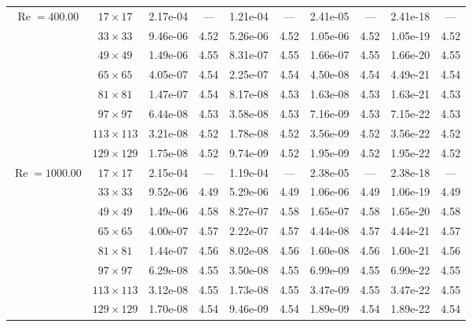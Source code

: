 \documentclass[preprint, 12pt]{elsarticle}
\begin{document}
{\begin{center}
\begin{table}[H]
{\begin{tabular*}{\textwidth}{@{\extracolsep\fill}cccccccccc@{}}
    \hline
    \multirow{7}{*}{$\operatorname{Re}=400.00$} & $17\times 17$ & 2.17e-04 & --- & 1.21e-04 & --- & 2.41e-05 & --- & 2.41e-18 & --- \\
    & $33\times 33$ & 9.46e-06 & 4.52 & 5.26e-06 & 4.52 & 1.05e-06 & 4.52 & 1.05e-19 & 4.52 \\
    & $49\times 49$ & 1.49e-06 & 4.55 & 8.31e-07 & 4.55 & 1.66e-07 & 4.55 & 1.66e-20 & 4.55 \\
    \multirow{3}{*}{$\operatorname{Wi}=10$} & $65\times 65$ & 4.05e-07 & 4.54 & 2.25e-07 & 4.54 & 4.50e-08 & 4.54 & 4.49e-21 & 4.54 \\
    & $81\times 81$ & 1.47e-07 & 4.54 & 8.17e-08 & 4.53 & 1.63e-08 & 4.53 & 1.63e-21 & 4.53 \\
    & $97\times 97$ & 6.44e-08 & 4.53 & 3.58e-08 & 4.53 & 7.16e-09 & 4.53 & 7.15e-22 & 4.53 \\
    & $113\times 113$ & 3.21e-08 & 4.52 & 1.78e-08 & 4.52 & 3.56e-09 & 4.52 & 3.56e-22 & 4.52 \\
    & $129\times 129$ & 1.75e-08 & 4.52 & 9.74e-09 & 4.52 & 1.95e-09 & 4.52 & 1.95e-22 & 4.52 \\
    \hline
    \multirow{7}{*}{$\operatorname{Re}=1000.00$} & $17\times 17$ & 2.15e-04 & --- & 1.19e-04 & --- & 2.38e-05 & --- & 2.38e-18 & --- \\
    & $33\times 33$ & 9.52e-06 & 4.49 & 5.29e-06 & 4.49 & 1.06e-06 & 4.49 & 1.06e-19 & 4.49 \\
    & $49\times 49$ & 1.49e-06 & 4.58 & 8.27e-07 & 4.58 & 1.65e-07 & 4.58 & 1.65e-20 & 4.58 \\
    \multirow{3}{*}{$\operatorname{Wi}=10$} & $65\times 65$ & 4.00e-07 & 4.57 & 2.22e-07 & 4.57 & 4.44e-08 & 4.57 & 4.44e-21 & 4.57 \\
    & $81\times 81$ & 1.44e-07 & 4.56 & 8.02e-08 & 4.56 & 1.60e-08 & 4.56 & 1.60e-21 & 4.56 \\
    & $97\times 97$ & 6.29e-08 & 4.55 & 3.50e-08 & 4.55 & 6.99e-09 & 4.55 & 6.99e-22 & 4.55 \\
    & $113\times 113$ & 3.12e-08 & 4.55 & 1.73e-08 & 4.55 & 3.47e-09 & 4.55 & 3.47e-22 & 4.55 \\
    & $129\times 129$ & 1.70e-08 & 4.54 & 9.46e-09 & 4.54 & 1.89e-09 & 4.54 & 1.89e-22 & 4.54 \\
    \hline
    \end{tabular*}
}
\end{table}
\end{center}
\begin{center}
\begin{table}[H]

\end{table}
\end{center}}
\end{document}
